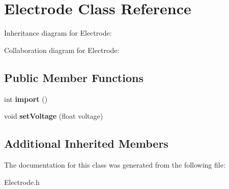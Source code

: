 \hypertarget{classElectrode}{\section{Electrode Class Reference}
\label{classElectrode}
}


Inheritance diagram for Electrode\+:


Collaboration diagram for Electrode\+:
\subsection*{Public Member Functions}
\begin{DoxyCompactItemize}
\item 
\hypertarget{classElectrode_a31a57e86375595b4ba472d70a1ca6756}{int {\bfseries import} ()}\label{classElectrode_a31a57e86375595b4ba472d70a1ca6756}

\item 
\hypertarget{classElectrode_ad51917c22c2b433c0807831fb945207d}{void {\bfseries set\+Voltage} (float voltage)}\label{classElectrode_ad51917c22c2b433c0807831fb945207d}

\end{DoxyCompactItemize}
\subsection*{Additional Inherited Members}


The documentation for this class was generated from the following file\+:\begin{DoxyCompactItemize}
\item 
Electrode.\+h\end{DoxyCompactItemize}

